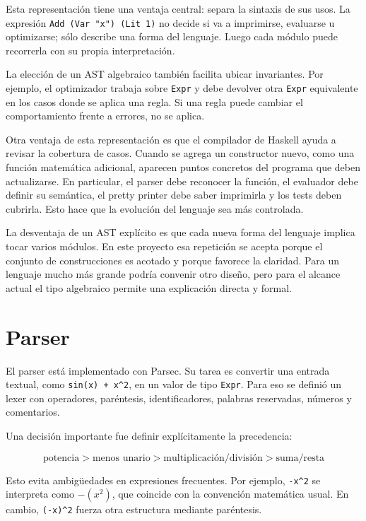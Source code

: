 \documentclass[11pt,a4paper]{article}
\begin{document}
Esta representación tiene una ventaja central: separa la sintaxis de sus usos. La expresión \texttt{Add (Var "x") (Lit 1)} no decide si va a imprimirse, evaluarse u optimizarse; sólo describe una forma del lenguaje. Luego cada módulo puede recorrerla con su propia interpretación.

La elección de un AST algebraico también facilita ubicar invariantes. Por ejemplo, el optimizador trabaja sobre \texttt{Expr} y debe devolver otra \texttt{Expr} equivalente en los casos donde se aplica una regla. Si una regla puede cambiar el comportamiento frente a errores, no se aplica.

Otra ventaja de esta representación es que el compilador de Haskell ayuda a revisar la cobertura de casos. Cuando se agrega un constructor nuevo, como una función matemática adicional, aparecen puntos concretos del programa que deben actualizarse. En particular, el parser debe reconocer la función, el evaluador debe definir su semántica, el pretty printer debe saber imprimirla y los tests deben cubrirla. Esto hace que la evolución del lenguaje sea más controlada.

La desventaja de un AST explícito es que cada nueva forma del lenguaje implica tocar varios módulos. En este proyecto esa repetición se acepta porque el conjunto de construcciones es acotado y porque favorece la claridad. Para un lenguaje mucho más grande podría convenir otro diseño, pero para el alcance actual el tipo algebraico permite una explicación directa y formal.

\section{Parser}

El parser está implementado con Parsec. Su tarea es convertir una entrada textual, como \texttt{sin(x) + x\^{}2}, en un valor de tipo \texttt{Expr}. Para eso se definió un lexer con operadores, paréntesis, identificadores, palabras reservadas, números y comentarios.

Una decisión importante fue definir explícitamente la precedencia:

\[
\text{potencia} > \text{menos unario} > \text{multiplicación/división} > \text{suma/resta}
\]

Esto evita ambigüedades en expresiones frecuentes. Por ejemplo, \texttt{-x\^{}2} se interpreta como \(-(x^2)\), que coincide con la convención matemática usual. En cambio, \texttt{(-x)\^{}2} fuerza otra estructura mediante paréntesis.
\end{document}
